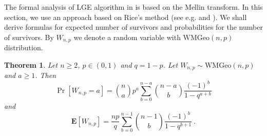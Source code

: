 \documentclass[proceedings]{dmtcs}
\newtheorem{theorem}{Theorem}
\newcommand{\E}[1]{\mathbf{E}\left[#1\right]}
\newcommand{\WGeo}[2]{\mathrm{WMGeo}(#1,#2)}
\begin{document}
The formal analysis of LGE algorithm in \cite{DBLP:conf/mascots/JacquetMM13} is based 
on the Mellin transform. In this section, we use an approach based on Rice's method (see e.g. \cite{Knuth:1998:ACP:280635} and \cite{journals/tcs/FlajoletS95}). We shall derive formulas for expected number of survivors and probabilities  
for the number of survivors. By $W_{n,p}$ we denote a random variable with $\WGeo{n}{p}$ distribution.
  
\begin{theorem}
\label{theorem:winners}
Let $n \geq 2$, $p\in (0,1)$ and $q=1-p$. Let $W_{n,p} \sim \WGeo{n}{p}$ and $a\geq 1$. Then
$$
  \Pr[W_{n,p}=a] = \binom{n}{a} p^a  \sum_{b=0}^{n-a} \binom{n-a}{b} \frac{(-1)^b}{1-q^{a+b}} 
$$
and
$$
  \E{W_{n,p}}   = \frac{n p}{q} \sum_{b=0}^{n-1} \binom{n-1}{b} \frac{(-1)^b}{1-q^{b+1}}~.
$$
\end{theorem}
\end{document}
